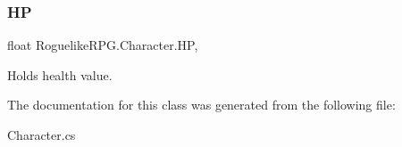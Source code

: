 \subsubsection{\texorpdfstring{HP}{HP}}
{\footnotesize\ttfamily float Roguelike\+R\+P\+G.\+Character.\+HP\hspace{0.3cm}{\ttfamily [get]}, {\ttfamily [set]}}



Holds health value. 



The documentation for this class was generated from the following file\+:\begin{DoxyCompactItemize}
\item 
Character.\+cs\end{DoxyCompactItemize}
